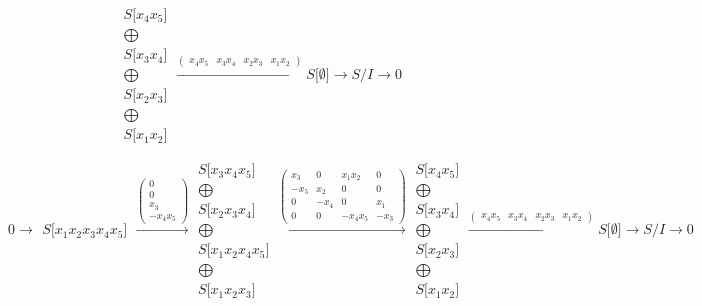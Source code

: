 \documentclass[12pt,a3paper,landscape]{amsart}
\numberwithin{equation}{section}
\theoremstyle{plain}
\theoremstyle{definition}
\begin{document}
$$\begin{matrix}
S \lbrack x_{4}x_{5} \rbrack \\ \bigoplus \\
S \lbrack x_{3}x_{4} \rbrack \\ \bigoplus \\
S \lbrack x_{2}x_{3} \rbrack \\ \bigoplus \\
S \lbrack x_{1}x_{2} \rbrack
\end{matrix}
\xrightarrow{\left( \begin{matrix}
x_{4}x_{5} & x_{3}x_{4} & x_{2}x_{3} & x_{1}x_{2}
\end{matrix} \right)}S \lbrack \emptyset \rbrack \rightarrow S/I \rightarrow 0
$$

$$
0 \rightarrow \begin{matrix}
S \lbrack x_{1}x_{2}x_{3}x_{4}x_{5} \rbrack
\end{matrix}
\xrightarrow{\left( \begin{matrix}
0 \\
0 \\
x_{3} \\
-x_{4}x_{5}
\end{matrix} \right)}\begin{matrix}
S \lbrack x_{3}x_{4}x_{5} \rbrack \\ \bigoplus \\
S \lbrack x_{2}x_{3}x_{4} \rbrack \\ \bigoplus \\
S \lbrack x_{1}x_{2}x_{4}x_{5} \rbrack \\ \bigoplus \\
S \lbrack x_{1}x_{2}x_{3} \rbrack
\end{matrix}
\xrightarrow{\left( \begin{matrix}
x_{3} & 0 & x_{1}x_{2} & 0 \\
-x_{5} & x_{2} & 0 & 0 \\
0 & -x_{4} & 0 & x_{1} \\
0 & 0 & -x_{4}x_{5} & -x_{3}
\end{matrix} \right)}\begin{matrix}
S \lbrack x_{4}x_{5} \rbrack \\ \bigoplus \\
S \lbrack x_{3}x_{4} \rbrack \\ \bigoplus \\
S \lbrack x_{2}x_{3} \rbrack \\ \bigoplus \\
S \lbrack x_{1}x_{2} \rbrack
\end{matrix}
\xrightarrow{\left( \begin{matrix}
x_{4}x_{5} & x_{3}x_{4} & x_{2}x_{3} & x_{1}x_{2}
\end{matrix} \right)}S \lbrack \emptyset \rbrack \rightarrow S/I \rightarrow 0
$$
\end{document}
